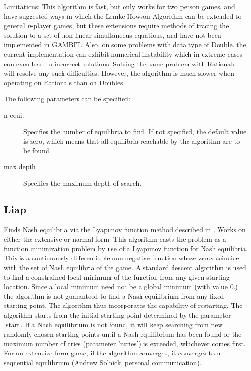 Limitations: This algorithm is fast, but only works for two person
games.  \cite{Wilson:1971} and \cite{Rosenmuller:1971} have suggested
ways in which the Lemke-Howson Algorithm can be extended to general
$n$-player games, but these extensions require methods of tracing the
solution to a set of non linear simultaneous equations, and have not
been implemented in GAMBIT.  Also, on some problems with data type of
Double, the current implementation can exhibit numerical instability
which in extreme cases can even lead to incorrect solutions.  Solving
the same problem with Rationals will resolve any such difficulties.
However, the algorithm is much slower when operating on Rationals than
on Doubles.

The following parameters can be specified:

\begin{description}
\item[n equi:] Specifies the number of equilibria to find.  If not specified,
the default value is zero, which means that all equilibria reachable by
the algorithm are to be found.
\item[max depth]
Specifies the maximum depth of search.
\end{description}

\subsection{Liap}\label{Liap}
Finds Nash equilibria via the Lyapunov function method
described in \cite{McK:91}.  Works on either the extensive or normal
form.  This algorithm casts the problem as a function minimization
problem by use of a Lyapunov function for Nash equilibria.  This is a
continuously differentiable non negative function whose zeros coincide
with the set of Nash equilibria of the game.  A standard descent
algorithm is used to find a constrained local minimum of the function
from any given starting location.  Since a local minimum need not be a
global minimum (with value 0,) the algorithm is not guaranteed to find
a Nash equilibrium from any fixed starting point.  The algorithm thus
incorporates the capability of restarting.  The algorithm starts from
the initial starting point determined by the parameter 'start'.  If a
Nash equilibrium is not found, it will keep searching from new
randomly chosen starting points until a Nash equilibrium has been
found or the maximum number of tries (parameter 'ntries') is exceeded,
whichever comes first.  For an extensive form game, if the algorithm
converges, it converges to a sequential equilibrium (Andrew Solnick,
personal communication).

